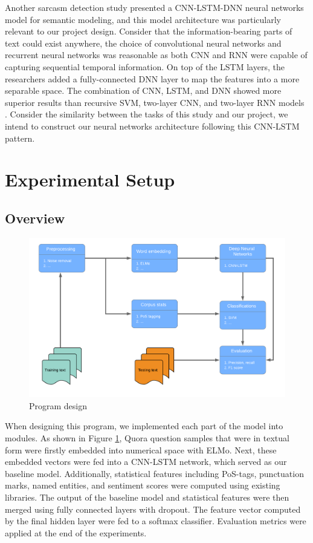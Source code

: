 \documentclass[12pt]{diazessay} %
\begin{document}
Another sarcasm detection study \citep{ghosh2016} presented a CNN-LSTM-DNN neural networks model for semantic modeling, and this model architecture was particularly relevant to our project design. Consider that the information-bearing parts of text could exist anywhere, the choice of convolutional neural networks and recurrent neural networks was reasonable as both CNN and RNN were capable of capturing sequential temporal information. On top of the LSTM layers, the researchers added a fully-connected DNN layer to map the features into a more separable space. The combination of CNN, LSTM, and DNN showed more superior results than recursive SVM, two-layer CNN, and two-layer RNN models \citep{ghosh2016}. Consider the similarity between the tasks of this study and our project, we intend to construct our neural networks architecture following this CNN-LSTM pattern. 

\section{Experimental Setup}

\subsection{Overview}
\begin{figure}[ht]
	\includegraphics[width=0.6\textheight, center]{graphs/program_desi_flow.png}
	\caption{Program design}
	\label{figure:program_design}
\end{figure}
When designing this program, we implemented each part of the model into modules. As shown in Figure \ref{figure:program_design}, Quora question samples that were in textual form were firstly embedded into numerical space with ELMo. Next, these embedded vectors were fed into a CNN-LSTM network, which served as our baseline model. Additionally, statistical features including PoS-tags, punctuation marks, named entities, and sentiment scores were computed using existing libraries. The output of the baseline model and statistical features were then merged using fully connected layers with dropout. The feature vector computed by the final hidden layer were fed to a softmax classifier. Evaluation metrics were applied at the end of the experiments.
\end{document}
